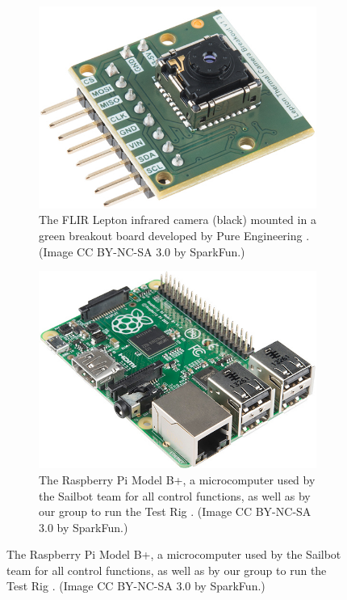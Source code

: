 \begin{figure}[h]
\centering

\begin{subfigure}{.50\textwidth}
\centering
\includegraphics[width=.90\linewidth]{"./image/lepton"}
\caption[FLIR Lepton]{\label{fig:lepton}The FLIR Lepton infrared camera (black) mounted in a green breakout board developed by Pure Engineering \cite{pure-eng}. (Image CC BY-NC-SA 3.0 by SparkFun.)}
\end{subfigure}%
\begin{subfigure}{.50\textwidth}
\centering
\includegraphics[width=.90\linewidth]{"./image/raspberry-pi"}
\caption[Raspberry Pi]{\label{fig:rpi}The Raspberry Pi Model B+, a microcomputer used by the Sailbot team for all control functions, as well as by our group to run the Test Rig \cite{rpi}. (Image CC BY-NC-SA 3.0 by SparkFun.)}
\end{subfigure}


\end{figure}
